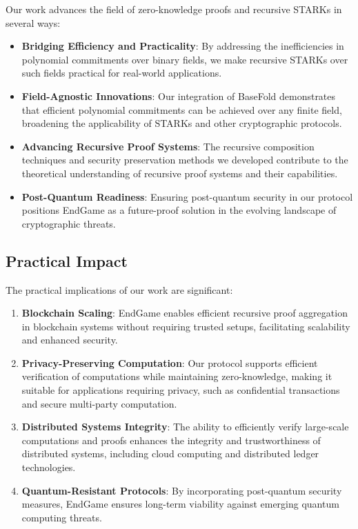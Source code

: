 \documentclass{article}
\theoremstyle{plain}
\theoremstyle{definition}
\theoremstyle{remark}
\theoremstyle{problem}
\begin{document}
Our work advances the field of zero-knowledge proofs and recursive STARKs in several ways:

\begin{itemize}
    \item \textbf{Bridging Efficiency and Practicality}: By addressing the inefficiencies in polynomial commitments over binary fields, we make recursive STARKs over such fields practical for real-world applications.

    \item \textbf{Field-Agnostic Innovations}: Our integration of BaseFold demonstrates that efficient polynomial commitments can be achieved over any finite field, broadening the applicability of STARKs and other cryptographic protocols.

    \item \textbf{Advancing Recursive Proof Systems}: The recursive composition techniques and security preservation methods we developed contribute to the theoretical understanding of recursive proof systems and their capabilities.

    \item \textbf{Post-Quantum Readiness}: Ensuring post-quantum security in our protocol positions EndGame as a future-proof solution in the evolving landscape of cryptographic threats.
\end{itemize}

\subsection{Practical Impact}

The practical implications of our work are significant:

\begin{enumerate}
    \item \textbf{Blockchain Scaling}: EndGame enables efficient recursive proof aggregation in blockchain systems without requiring trusted setups, facilitating scalability and enhanced security.

    \item \textbf{Privacy-Preserving Computation}: Our protocol supports efficient verification of computations while maintaining zero-knowledge, making it suitable for applications requiring privacy, such as confidential transactions and secure multi-party computation.

    \item \textbf{Distributed Systems Integrity}: The ability to efficiently verify large-scale computations and proofs enhances the integrity and trustworthiness of distributed systems, including cloud computing and distributed ledger technologies.

    \item \textbf{Quantum-Resistant Protocols}: By incorporating post-quantum security measures, EndGame ensures long-term viability against emerging quantum computing threats.
\end{enumerate}
\end{document}

